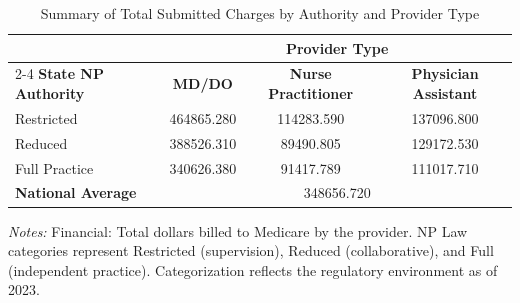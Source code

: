 \begin{table}[htbp]
    \centering
    \caption{Summary of Total Submitted Charges by Authority and Provider Type}
    \label{tab:tot_sbmtd_chrg}
    \vspace{0.2cm}
    \begin{tabular}{lccc}
        \toprule
        & \multicolumn{3}{c}{\textbf{Provider Type}} \\
        \cmidrule(lr){2-4}
        \textbf{State NP Authority} & \textbf{MD/DO} & \textbf{Nurse Practitioner} & \textbf{Physician Assistant} \\
        \midrule
        Restricted & 464865.280 & 114283.590 & 137096.800 \\
        Reduced & 388526.310 & 89490.805 & 129172.530 \\
        Full Practice & 340626.380 & 91417.789 & 111017.710 \\
        \midrule
        \textbf{National Average} & \multicolumn{3}{c}{348656.720} \\
        \bottomrule
    \end{tabular}
    \vspace{0.1cm}
    \begin{minipage}{0.85\textwidth}
        \footnotesize \textit{Notes:} Financial: Total dollars billed to Medicare by the provider. NP Law categories represent Restricted (supervision), Reduced (collaborative), and Full (independent practice). Categorization reflects the regulatory environment as of 2023.
    \end{minipage}
\end{table}